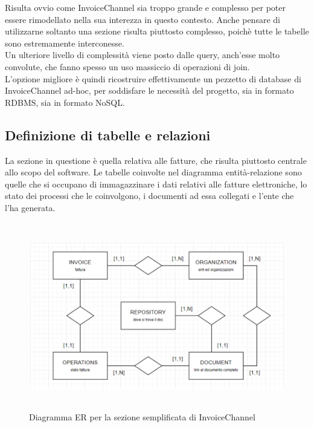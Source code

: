 \noindent Risulta ovvio come InvoiceChannel sia troppo grande e complesso per poter essere rimodellato nella sua interezza in questo contesto. Anche pensare di utilizzarne soltanto una sezione risulta piuttosto complesso, poichè tutte le tabelle sono estremamente interconesse.\\
Un ulteriore livello di complessità viene posto dalle query, anch'esse molto convolute, che fanno spesso un uso massiccio di operazioni di join.\\
L'opzione migliore è quindi ricostruire effettivamente un pezzetto di database di InvoiceChannel ad-hoc, per soddisfare le necessità del progetto, sia in formato RDBMS, sia in formato NoSQL.\\

\subsection{Definizione di tabelle e relazioni}
La sezione in questione è quella relativa alle fatture, che risulta piuttosto centrale allo scopo del software. Le tabelle coinvolte nel diagramma entità-relazione sono quelle che si occupano di immagazzinare i dati relativi alle fatture elettroniche, lo stato dei processi che le coinvolgono, i documenti ad essa collegati e l'ente che l'ha generata.\\

\begin{figure}[htbp]
\begin{center}
\includegraphics[height=22em]{immagini/ER-Mock-IC.png}
\caption{Diagramma ER per la sezione semplificata di InvoiceChannel}\label{img:schema-er}
\end{center}
\end{figure}

